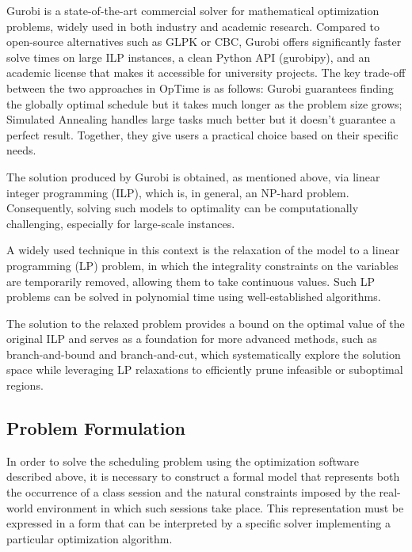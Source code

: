 \documentclass[11pt,a4paper]{article}
\begin{document}
Gurobi is a state-of-the-art commercial solver for mathematical optimization problems, widely used in both industry and academic research. Compared to open-source alternatives such as GLPK or CBC, Gurobi offers significantly faster solve times on large ILP instances, a clean Python API (gurobipy), and an academic license that makes it accessible for university projects. The key trade-off between the two approaches in OpTime is as follows: Gurobi guarantees finding the globally optimal schedule but it takes much longer as the problem size grows; Simulated Annealing handles large tasks much better but it doesn't guarantee a perfect result. Together, they give users a practical choice based on their specific needs.

The solution produced by Gurobi is obtained, as mentioned above, via linear integer programming (ILP), which is, in general, an NP-hard problem. Consequently, solving such models to optimality can be computationally challenging, especially for large-scale instances.

A widely used technique in this context is the relaxation of the model to a linear programming (LP) problem, in which the integrality constraints on the variables are temporarily removed, allowing them to take continuous values. Such LP problems can be solved in polynomial time using well-established algorithms.

The solution to the relaxed problem provides a bound on the optimal value of the original ILP and serves as a foundation for more advanced methods, such as branch-and-bound and branch-and-cut, which systematically explore the solution space while leveraging LP relaxations to efficiently prune infeasible or suboptimal regions.

\subsection{Problem Formulation}
In order to solve the scheduling problem using the optimization software described above, it is necessary to construct a formal model that represents both the occurrence of a class session and the natural constraints imposed by the real-world environment in which such sessions take place. This representation must be expressed in a form that can be interpreted by a specific solver implementing a particular optimization algorithm.
\end{document}
